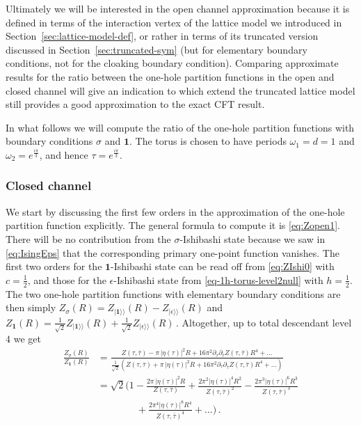 \documentclass[11pt,a4paper]{article}
\numberwithin{equation}{section}
\def\ket#1{|{#1}\rangle}
\newcommand{\one}{\mathbf{1}} %
\begin{document}
Ultimately we will be interested in the open channel approximation because it is defined in terms of the interaction vertex of the lattice model we introduced in Section~\ref{sec:lattice-model-def}, or rather in terms of its truncated version discussed in Section~\ref{sec:truncated-sym} (but for elementary boundary conditions, not for the cloaking boundary condition).
Comparing approximate results for the ratio between the one-hole partition functions in the open and closed channel will give an indication to which extend the truncated lattice model still provides a good approximation to the exact CFT result.

\medskip

In what follows we will compute the ratio of the one-hole partition functions with boundary conditions $\sigma$ and $\one$. The torus is chosen to have periods $\omega_1 = d = 1$ and $\omega_2 = e^{\frac{i\pi}{3}}$, and hence $\tau= e^{\frac{i\pi}{3}}$.  

\subsubsection{Closed channel}

We start by discussing the first few orders in the approximation of the one-hole partition function explicitly. The general formula to compute it is \eqref{eq:Zopen1}. There will be no contribution from the $\sigma$-Ishibashi state because we saw in \eqref{eq:IsingEps} that the corresponding primary one-point function vanishes. 
The first two orders for the $\one$-Ishibashi state can be read off from \eqref{eq:ZIshi0} with $c=\frac{1}{2}$, and those for the $\epsilon$-Ishibashi state from \eqref{eq-1h-torus-level2null} with $h=\frac12$.
The two one-hole partition functions with elementary boundary conditions are then simply $Z_\sigma(R) = Z_{\ket{\one}\!\rangle}(R) - Z_{\ket{\epsilon}\!\rangle}(R)$ and $Z_\one(R) = \frac{1}{\sqrt{2}} Z_{\ket{\one}\!\rangle}(R) +\frac{1}{\sqrt{2}} Z_{\ket{\epsilon}\!\rangle}(R)$\,.
Altogether, up to total descendant level $4$ we get 
\begin{align}
    \frac{Z_{\sigma}(R)}{Z_{\one}(R)} &=  \frac{Z(\tau,\bar{\tau})  - \pi\, \left|\eta\left(\tau\right)\right|^2  R + 16 \pi^2 \partial_\tau\partial_{\bar\tau}Z(\tau,\bar{\tau})  R^4 +\dots }{\frac{1}{\sqrt{2}}\left(Z(\tau,\bar{\tau})  + \pi\,  \left|\eta\left(\tau\right)\right|^2  R + 16 \pi^2 \partial_\tau\partial_{\bar\tau}Z(\tau,\bar{\tau})  R^4 + \dots\right)} 
    \nonumber \\
    &= \sqrt{2} \Big(1 -  \frac{2 \pi\,  \left|\eta\left(\tau\right)\right|^2 R}{Z\left(\tau,\bar\tau\right)} + \frac{2 \pi^2 \left|\eta\left(\tau\right)\right|^4 R^2 }{Z(\tau,\bar\tau)^2} - \frac{2 \pi^3 \left|\eta\left(\tau\right)\right|^6 R^3 }{Z(\tau,\bar\tau)^3} 
    \nonumber \\
    &\qquad\qquad+ \frac{2 \pi^4 \left|\eta\left(\tau\right)\right|^8 R^4 }{Z(\tau,\bar\tau)^4}  + \dots\Big)\,.
\end{align}
\end{document}
